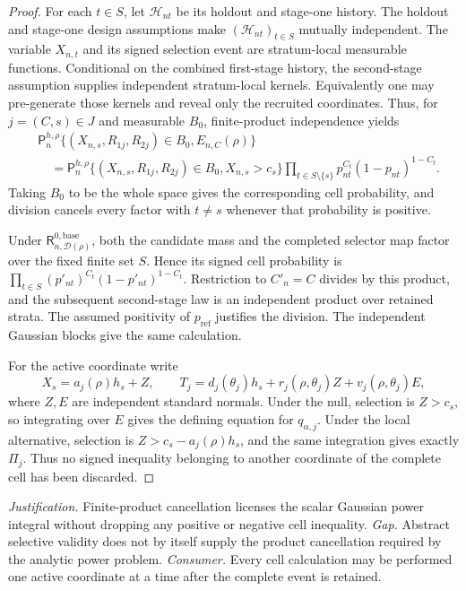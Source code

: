 \documentclass{article}
\begin{document}
\begin{proof}
For each \(t\in S\), let \(\mathcal H_{nt}\) be its holdout and stage-one history.  The holdout and stage-one design assumptions make \((\mathcal H_{nt})_{t\in S}\) mutually independent.  The variable \(X_{n,t}\) and its signed selection event are stratum-local measurable functions.  Conditional on the combined first-stage history, the second-stage assumption supplies independent stratum-local kernels.  Equivalently one may pre-generate those kernels and reveal only the recruited coordinates.  Thus, for \(j=(C,s)\in J\) and measurable \(B_0\), finite-product independence yields
\[
\begin{aligned}
&\mathsf P_n^{h,\rho}\{(X_{n,s},R_{1j},R_{2j})\in B_0,E_{n,C}(\rho)\}\\
&\quad=\mathsf P_n^{h,\rho}\{(X_{n,s},R_{1j},R_{2j})\in B_0,X_{n,s}>c_s\}
\prod_{t\in S\setminus\{s\}}p_{nt}^{C_t}(1-p_{nt})^{1-C_t}.
\end{aligned}
\]
Taking \(B_0\) to be the whole space gives the corresponding cell probability, and division cancels every factor with \(t\ne s\) whenever that probability is positive.

Under \(\mathsf R_{n,\mathcal D(\rho)}^{0,\mathrm{base}}\), both the candidate mass and the completed selector map factor over the fixed finite set \(S\).  Hence its signed cell probability is \(\prod_{t\in S}(p'_{nt})^{C_t}(1-p'_{nt})^{1-C_t}\).  Restriction to \(C'_n=C\) divides by this product, and the subsequent second-stage law is an independent product over retained strata.  The assumed positivity of \(p_{\mathrm{ref}}\) justifies the division.  The independent Gaussian blocks give the same calculation.

For the active coordinate write
\[
X_s=a_j(\rho)h_s+Z,
\qquad
T_j=d_j(\theta_j)h_s+r_j(\rho,\theta_j)Z+v_j(\rho,\theta_j)E,
\]
where \(Z,E\) are independent standard normals.  Under the null, selection is \(Z>c_s\), so integrating over \(E\) gives the defining equation for \(q_{\alpha,j}\).  Under the local alternative, selection is \(Z>c_s-a_j(\rho)h_s\), and the same integration gives exactly \(\Pi_j\).  Thus no signed inequality belonging to another coordinate of the complete cell has been discarded.
\end{proof}
\par\smallskip\noindent \textit{Justification.} Finite-product cancellation licenses the scalar Gaussian power integral without dropping any positive or negative cell inequality. \textit{Gap.} Abstract selective validity does not by itself supply the product cancellation required by the analytic power problem. \textit{Consumer.} Every cell calculation may be performed one active coordinate at a time after the complete event is retained.
\end{document}
